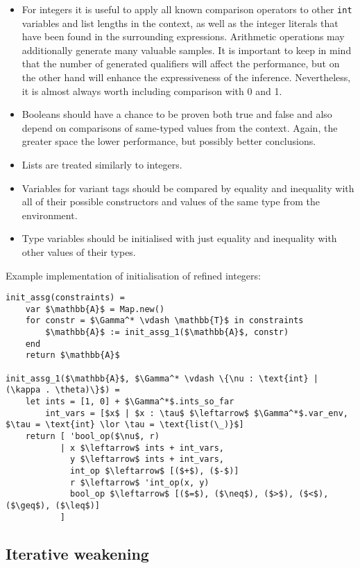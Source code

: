 \begin{itemize}
\item For integers it is useful to apply all known comparison operators to other
  \texttt{int} variables and list lengths in the context, as well as the integer
  literals that have been found in the surrounding expressions. Arithmetic
  operations may additionally generate many valuable samples. It is important to
  keep in mind that the number of generated qualifiers will affect the
  performance, but on the other hand will enhance the expressiveness of the
  inference. Nevertheless, it is almost always worth including comparison with 0
  and 1.
\item Booleans should have a chance to be proven both true and false and also
  depend on comparisons of same-typed values from the context. Again, the
  greater space the lower performance, but possibly better conclusions.
\item Lists are treated similarly to integers.
\item Variables for variant tags should be compared by equality and inequality
  with all of their possible constructors and values of the same type from the
  environment.
\item Type variables should be initialised with just equality and inequality
  with other values of their types.
\end{itemize}

Example implementation of initialisation of refined integers:

\begin{lstlisting}[language=pseudocode]
init_assg(constraints) =
    var $\mathbb{A}$ = Map.new()
    for constr = $\Gamma^* \vdash \mathbb{T}$ in constraints
        $\mathbb{A}$ := init_assg_1($\mathbb{A}$, constr)
    end
    return $\mathbb{A}$

init_assg_1($\mathbb{A}$, $\Gamma^* \vdash \{\nu : \text{int} | (\kappa . \theta)\}$) =
    let ints = [1, 0] + $\Gamma^*$.ints_so_far
        int_vars = [$x$ | $x : \tau$ $\leftarrow$ $\Gamma^*$.var_env, $\tau = \text{int} \lor \tau = \text{list(\_)}$]
    return [ 'bool_op($\nu$, r)
           | x $\leftarrow$ ints + int_vars,
             y $\leftarrow$ ints + int_vars,
             int_op $\leftarrow$ [($+$), ($-$)]
             r $\leftarrow$ 'int_op(x, y)
             bool_op $\leftarrow$ [($=$), ($\neq$), ($>$), ($<$), ($\geq$), ($\leq$)]
           ]
\end{lstlisting}

\subsection{Iterative weakening}

